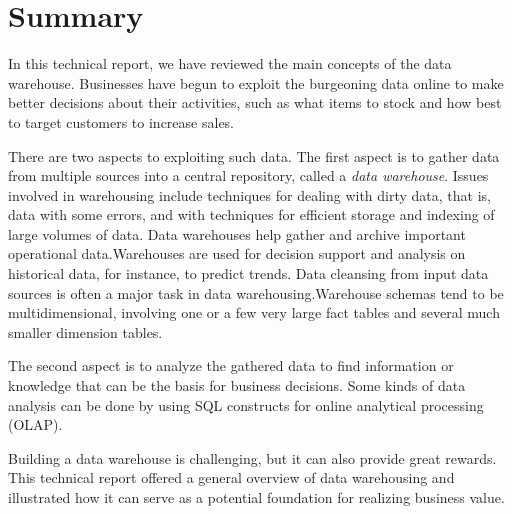 \documentclass{vldb}
\begin{document}
\section{Summary}
In this technical report, we have reviewed the main concepts of the data warehouse.
Businesses have begun to exploit the burgeoning data online to make better
decisions about their activities, such as what items to stock and how best to target
customers to increase sales. 

There are two aspects to exploiting such data. The first aspect is to gather data from multiple sources into a central repository, called a \textit{data warehouse}. Issues involved in warehousing include techniques for dealing
with dirty data, that is, data with some errors, and with techniques for efficient
storage and indexing of large volumes of data.
Data warehouses help gather and archive important operational data.Warehouses
are used for decision support and analysis on historical data, for
instance, to predict trends. Data cleansing from input data sources is often a
major task in data warehousing.Warehouse schemas tend to be multidimensional,
involving one or a few very large fact tables and several much smaller
dimension tables.

The second aspect is to analyze the gathered data to find information or
knowledge that can be the basis for business decisions. Some kinds of data analysis
can be done by using SQL constructs for online analytical processing (OLAP).

Building a data warehouse is challenging, but it can also provide great rewards.
This technical report offered a general overview of data warehousing and illustrated how it can serve as a potential foundation for realizing business value. 




\end{document}
